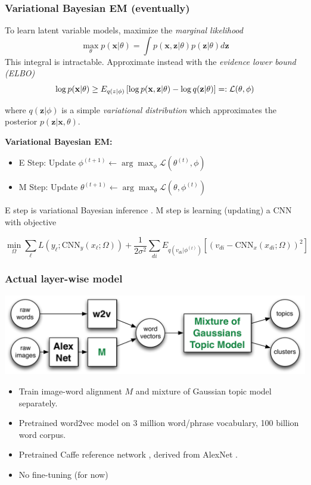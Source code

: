 \documentclass{beamer}
\begin{document}
\begin{frame}
  \frametitle{Variational Bayesian EM (eventually)}
  To learn latent variable models, maximize the \emph{marginal likelihood}
  \[
  \max_{\theta}p(\mathbf{x}|\theta)=\int p(\mathbf{x},\mathbf{z}|\theta)p(\mathbf{z}|\theta)d\mathbf{z}
  \]
  This integral is intractable. Approximate instead with the \emph{evidence lower bound (ELBO)}
  \[
  \log p(\mathbf{x}|\theta)\geq E_{q(z|\phi)}\left[\log p(\mathbf{x},\mathbf{z}|\theta)-\log q(\mathbf{z}|\theta)\right]=:{\cal L}(\theta,\phi)
  \]
  {\small where $q(\mathbf{z}|\phi)$ is a simple \emph{variational distribution} which approximates the posterior $p(\mathbf{z}|\mathbf{x},\theta)$. \par}
  \textbf{Variational Bayesian EM:}
  \begin{itemize}
  \item E Step: Update $\phi^{(t+1)}\leftarrow\arg\max_{\phi}\mathcal{L}(\theta^{(t)},\phi)$
  \item M Step: Update $\theta^{(t+1)}\leftarrow\arg\max_{\theta}\mathcal{L}(\theta,\phi^{(t)})$
  \end{itemize}
  {\small 
    E step is variational Bayesian inference \citep{WangC13, Ranganath14}. M step is learning (updating) a CNN with objective
    \par}
  \[ \min_\Omega \sum_\ell L(y_\ell ; \text{CNN}_y(x_\ell ; \Omega)) + \frac{1}{2\sigma^2} \sum_{di} E_{q(v_{di}|\phi^(t))} \left[ (v_{di} - \text{CNN}_x(x_{di} ; \Omega))^2 \right] \]
\end{frame}

\begin{frame}
  \frametitle{Actual layer-wise model}
  \begin{center}
    \includegraphics[width=\textwidth]{assets/stagewise_model.pdf}
  \end{center}

  {\small
  \begin{itemize}
    \item Train image-word alignment $M$ and mixture of Gaussian topic model separately.
    \item Pretrained word2vec model on 3 million word/phrase vocabulary, 100 billion word corpus. 
    \item Pretrained Caffe reference network \citep{Jia14}, derived from AlexNet \citep{Krizhevsky12}.
    \item No fine-tuning (for now)
  \end{itemize}
  \par}
\end{frame}
\end{document}
